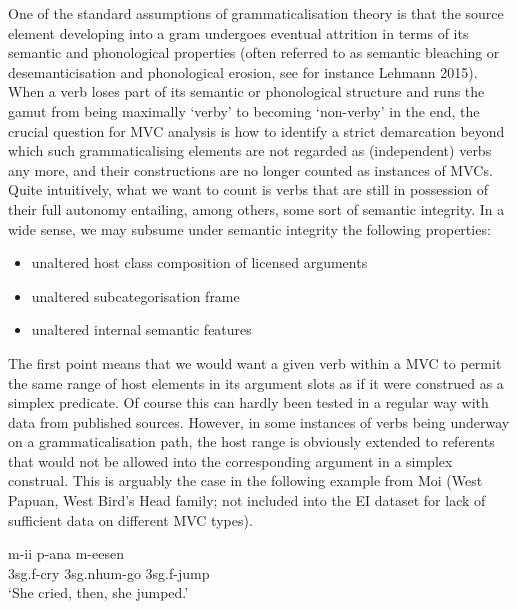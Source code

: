 One of the standard assumptions of grammaticalisation theory is that the source element developing into a gram undergoes eventual attrition in terms of its semantic and phonological properties (often referred to as semantic bleaching or desemanticisation and phonological erosion, see for instance Lehmann 2015). When a verb loses part of its semantic or phonological structure and runs the gamut from being maximally `verby’ to becoming `non-verby’ in the end, the crucial question for MVC analysis is how to identify a strict demarcation beyond which such grammaticalising elements are not regarded as (independent) verbs any more, and their constructions are no longer counted as instances of MVCs. Quite intuitively, what we want to count is verbs that are still in possession of their full autonomy entailing, among others, some sort of semantic integrity. In a wide sense, we may subsume under semantic integrity the following properties:


\begin{itemize}
\item unaltered host class composition of licensed arguments
\item unaltered subcategorisation frame
\item unaltered internal semantic features
\end{itemize}
	

The first point means that we would want a given verb within a MVC to permit the same range of host elements in its argument slots as if it were construed as a simplex predicate. Of course this can hardly been tested in a regular way with data from published sources. However, in some instances of verbs being underway on a grammaticalisation path, the host range is obviously extended to referents that would not be allowed into the corresponding argument in a simplex construal. This is arguably the case in the following example from Moi (West Papuan, West Bird's Head family; not included into the EI dataset for lack of sufficient data on different MVC types).

\ea \label{Moi}
\gll m-ii p-ana m-eesen \\
3\acs{sg}.\acs{f}-cry 3\acs{sg}.\acs{nhum}-go 3\acs{sg}.\acs{f}-jump \\
\glft `She cried, then, she jumped.’ \\ 
\z
\xe


